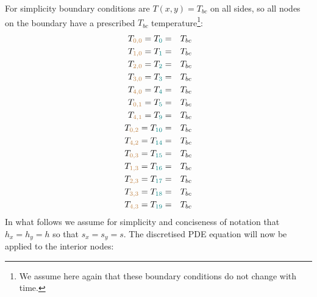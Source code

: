 For simplicity boundary conditions are $T(x,y)=T_{bc}$ on all sides, so all nodes 
on the boundary have a prescribed $T_{bc}$ temperature\footnote{We assume
here again that these boundary conditions do not change with time.}:
\begin{eqnarray}
T_{\color{brown}0,0} = T_{\color{teal} 0}  &=& T_{bc} \nonumber\\
T_{\color{brown}1,0} = T_{\color{teal} 1}  &=& T_{bc} \nonumber\\
T_{\color{brown}2,0} = T_{\color{teal} 2}  &=& T_{bc} \nonumber\\
T_{\color{brown}3,0} = T_{\color{teal} 3}  &=& T_{bc} \nonumber\\
T_{\color{brown}4,0} = T_{\color{teal} 4}  &=& T_{bc} \nonumber\\
T_{\color{brown}0,1} = T_{\color{teal} 5}  &=& T_{bc} \nonumber\\
T_{\color{brown}4,1} = T_{\color{teal} 9}  &=& T_{bc} \nonumber\\
T_{\color{brown}0,2} = T_{\color{teal} 10} &=& T_{bc} \nonumber\\
T_{\color{brown}4,2} = T_{\color{teal} 14} &=& T_{bc} \nonumber\\
T_{\color{brown}0,3} = T_{\color{teal} 15} &=& T_{bc} \nonumber\\
T_{\color{brown}1,3} = T_{\color{teal} 16} &=& T_{bc} \nonumber\\
T_{\color{brown}2,3} = T_{\color{teal} 17} &=& T_{bc} \nonumber\\
T_{\color{brown}3,3} = T_{\color{teal} 18} &=& T_{bc} \nonumber\\
T_{\color{brown}4,3} = T_{\color{teal} 19} &=& T_{bc} \nonumber
\end{eqnarray}
In what follows we assume for simplicity and conciseness of notation that 
$h_x=h_y=h$ so that $s_x=s_y=s$.
The discretised PDE equation will now be applied to the interior nodes:

